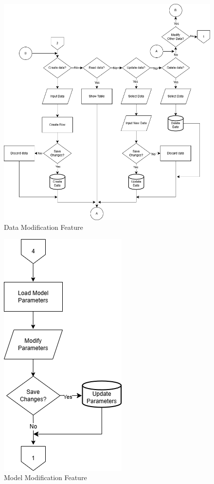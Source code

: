 \begin{appendices}
\begin{centerappendixtitle}
		\begin{figure}[h]
			\centering
			\caption{Data Modification Feature}
			\label{dataModifFlow}
			\includegraphics[scale=0.6]{appendix/data modif f}
		\end{figure}
		
		\begin{figure}[h]
			\centering
			\caption{Model Modification Feature}
			\label{modelFLow}
			\includegraphics[scale=0.7]{appendix/modelset f}
		\end{figure}
		

\end{centerappendixtitle}
\end{appendices}
